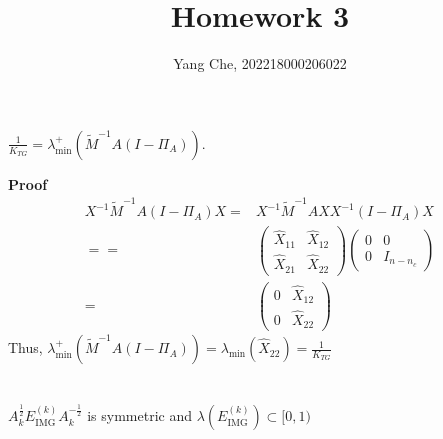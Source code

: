 \documentclass{article}
\title{Homework 3} %
\author{Yang Che,  202218000206022} %
\date{} %
\begin{document}

\maketitle %



\section{ }
$\frac{1}{K_{TG}}=\lambda_{\min}^+(\tilde{M}^{-1}A(I-\Pi_A)).$

\textbf{Proof}
\begin{equation*}
    \begin{aligned}
        X^{-1}\tilde{M}^{-1}A(I-\Pi_A)X=   & X^{-1}\tilde{M}^{-1}AXX^{-1}(I-\Pi_A)X \\
        =                                = & \begin{pmatrix}
                                                 \hat{X}_{11} & \hat{X}_{12} \\
                                                 \hat{X}_{21} & \hat{X}_{22}
                                             \end{pmatrix}
        \begin{pmatrix}
            0 & 0         \\
            0 & I_{n-n_c}
        \end{pmatrix}                                                              \\
        =                                  & \begin{pmatrix}
                                                 0 & \hat{X}_{12} \\
                                                 0 & \hat{X}_{22}
                                             \end{pmatrix}
    \end{aligned}
\end{equation*}
Thus, $\lambda_{\min}^+(\tilde{M}^{-1}A(I-\Pi_A))=\lambda_{\min}(\hat{X}_{22})=\frac{1}{K_{TG}}$

\section{ }
$A_k^{\frac{1}{2}}E^{(k)}_\text{IMG}A_k^{-\frac{1}{2}}$ is symmetric and $\lambda(E_\text{IMG}^{(k)})\subset[0,1)$
\end{document}
